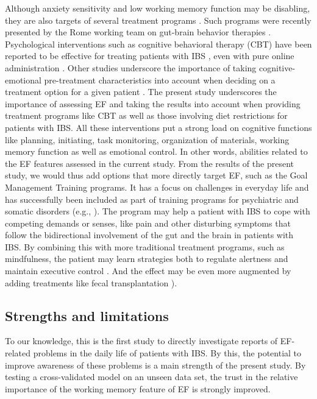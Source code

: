 \documentclass[jcm,article,submit,pdftex,moreauthors]{Definitions/mdpi}
\begin{document}
Although anxiety sensitivity and low working memory function may be disabling, they are also targets of several treatment programs \cite{otto2016anxiety}. Such programs were recently presented by the Rome working team on gut-brain behavior therapies \cite{keefer2022rome}. Psychological interventions such as cognitive behavioral therapy (CBT) have been reported to be effective for treating patients with IBS \cite{sugaya2021cognitive}, even with pure online administration \cite{kim2022internet}. Other studies underscore the importance of taking cognitive-emotional pre-treatment characteristics into account when deciding on a treatment option for a given patient \cite{sarter2021cognitive}. The present study underscores the importance of assessing EF and taking the results into account when providing treatment programs like CBT as well as those involving diet restrictions for patients with IBS. All these interventions put a strong load on cognitive functions like planning, initiating, task monitoring, organization of materials, working memory function as well as emotional control. In other words, abilities related to the EF features assessed in the current study. From the results of the present study, we would thus add options that more directly target EF, such as the Goal Management Training programs. It has a focus on challenges in everyday life and has successfully been included as part of training programs for psychiatric and somatic disorders (e.g., \cite{jensen2021exploratory, boyd2022pilot, haugen2022randomized}). The program may help a patient with IBS to cope with competing demands or senses,  like pain and other disturbing symptoms that follow the bidirectional involvement of the gut and the brain in patients with IBS. By combining this with more traditional treatment programs, such as mindfulness, the patient may learn strategies both to regulate alertness and maintain executive control \cite{robertson1995sustained}. And the effect may be even more augmented by adding treatments like fecal transplantation \cite{Magdy2021}). 


\subsection{Strengths and limitations}
To our knowledge, this is the first study to directly investigate reports of EF-related problems in the daily life of patients with IBS. By this, the potential to improve awareness of these problems is a main strength of the present study. By testing a cross-validated model on an unseen data set, the trust in the relative importance of the working memory feature of EF is strongly improved. 
\end{document}
